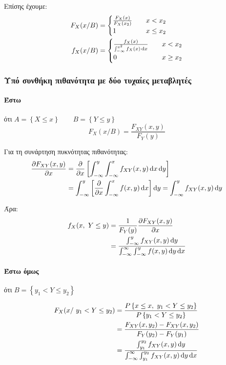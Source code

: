 \documentclass[11pt,a4paper,notitlepage,fleqn,final]{article}
\begin{document}
	Επίσης έχουμε:
	\begin{align*}
		F_X(x/B) &= \begin{cases}
		\frac{F_X(x)}{F_X(x_2)} &\quad x<x_2 \\
		1 &\quad x\leq x_2
		\end{cases} \\
		f_X(x/B) &= \begin{cases}
		\frac{f_X(x)}{\int_{-\infty}^{x^2} f_X(x) \mathop{}\!\mathrm{d} x}
		&\quad x<x_2 \\ 0 &\quad x \geq x_2
		\end{cases}
	\end{align*}
	
	\subsubsection{Υπό συνθήκη πιθανότητα με δύο τυχαίες μεταβλητές}
	
	\paragraph{Έστω} ότι \( A=\left\lbrace X \leq x \right\rbrace 
	\qquad B = \left\lbrace Y \leq y \right\rbrace
	\)
	\[
	\boxed{F_X(x/B)
		= \frac{F_{XY}(x,y)}{F_Y(y)}} 
	\]
	
	Για τη συνάρτηση πυκνότητας πιθανότητας:
	\begin{align*}
		\pd{F_{XY}(x,y)}{x} &= \pd{}{x} \left[
		\int_{-\infty}^{y} \int_{-\infty}^{x} f_{XY} (x,y)\dif x\dif y
		\right] \\ &=
		\int_{-\infty}^{y} \left[\pd{}{x}\int_{-\infty}^{x}f(x,y)
		\dif x\right]\dif y = \int_{-\infty}^{y} f_{XY}(x,y)\dif y
	\end{align*}
	
	Άρα:
	\begin{align*}
		f_X (x,\ Y \leq y) &= \frac{1}{F_Y(y)}\pd{F_{XY}(x,y)}{x} \\
		&= \frac{\int_{-\infty}^{y}f_{XY}(x,y)\dif y}{
			\int_{-\infty}^{\infty} \int_{-\infty}^{y}
			f(x,y)\dif y\dif x}
	\end{align*}

    \paragraph{Έστω όμως} ότι
    \( B = \left\lbrace y_1 < Y \leq y_2 \right\rbrace \)
    
    \begin{align*}
    	F_X(x/\ y_1 < Y \leq y_2) &=
    	\frac{P\left\lbrace x\leq x,\ y_1 < Y \leq y_2\right\rbrace}{
    		P\left\lbrace y_1 < Y \leq y_2 \right\rbrace}
    	\\ &= \frac{F_{XY}(x,y_2) - F_{XY}(x,y_2)}{
    		F_Y(y_2)-F_Y(y_1)}
    	\\ &= \frac{\int_{y_1}^{y_2} f_{XY}(x,y)\mathop{}\!\mathrm{d} y}{
    		\int_{-\infty}^{\infty} \int_{y_1}^{y_2} f_{XY}(x,y)
    		\mathop{}\!\mathrm{d} y\mathop{}\!\mathrm{d} x}
    \end{align*}
    
\end{document}
